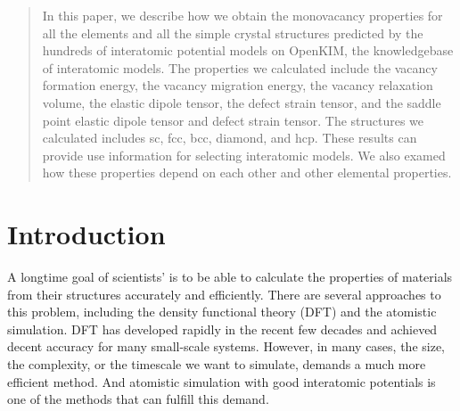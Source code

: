 \documentclass[%
 reprint,
 amsmath,amssymb,
 aps,
]{revtex4-1}
\begin{document}
\begin{abstract}
In this paper, we describe how we obtain the monovacancy properties for all the elements and all the simple crystal structures predicted by the hundreds of interatomic potential models on OpenKIM, the knowledgebase of interatomic models.
The properties we calculated include the vacancy formation energy, the vacancy migration energy, the vacancy relaxation volume, the elastic dipole tensor, the defect strain tensor, and the saddle point elastic dipole tensor and defect strain tensor.
The structures we calculated includes sc, fcc, bcc, diamond, and hcp.
These results can provide use information for selecting interatomic models.
We also examed how these properties depend on each other and other elemental properties.

\end{abstract}

\maketitle


\section{\label{sec:intro}Introduction}

A longtime goal of scientists' is to be able to calculate the properties of materials from their structures accurately and efficiently.
There are several approaches to this problem, including the density functional theory (DFT) and the atomistic simulation.
DFT has developed rapidly in the recent few decades and achieved decent accuracy for many small-scale systems.
However, in many cases, the size, the complexity, or the timescale we want to simulate, demands a much more efficient method.
And atomistic simulation with good interatomic potentials is one of the methods that can fulfill this demand.
\end{document}
